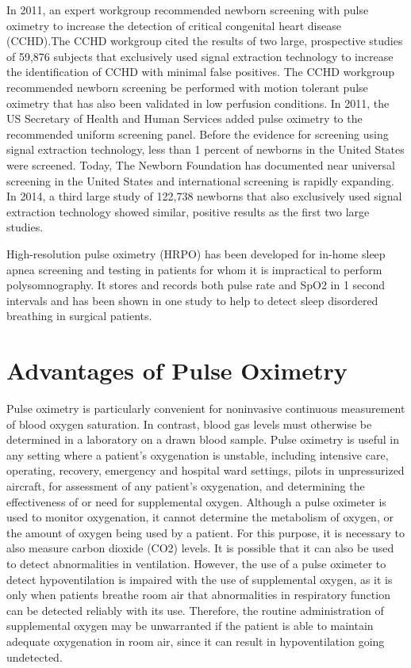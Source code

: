 \documentclass[12pt]{article}
\begin{document}
In 2011, an expert workgroup recommended newborn screening with pulse oximetry to increase the detection of critical congenital heart disease (CCHD).The CCHD workgroup cited the results of two large, prospective studies of 59,876 subjects that exclusively used signal extraction technology to increase the identification of CCHD with minimal false positives. The CCHD workgroup recommended newborn screening be performed with motion tolerant pulse oximetry that has also been validated in low perfusion conditions. In 2011, the US Secretary of Health and Human Services added pulse oximetry to the recommended uniform screening panel. Before the evidence for screening using signal extraction technology, less than 1 percent of newborns in the United States were screened. Today, The Newborn Foundation has documented near universal screening in the United States and international screening is rapidly expanding. In 2014, a third large study of 122,738 newborns that also exclusively used signal extraction technology showed similar, positive results as the first two large studies.

High-resolution pulse oximetry (HRPO) has been developed for in-home sleep apnea screening and testing in patients for whom it is impractical to perform polysomnography. It stores and records both pulse rate and SpO2 in 1 second intervals and has been shown in one study to help to detect sleep disordered breathing in surgical patients.


\section{Advantages of Pulse Oximetry}
Pulse oximetry is particularly convenient for noninvasive continuous measurement of blood oxygen saturation. In contrast, blood gas levels must otherwise be determined in a laboratory on a drawn blood sample. Pulse oximetry is useful in any setting where a patient's oxygenation is unstable, including intensive care, operating, recovery, emergency and hospital ward settings, pilots in unpressurized aircraft, for assessment of any patient's oxygenation, and determining the effectiveness of or need for supplemental oxygen. Although a pulse oximeter is used to monitor oxygenation, it cannot determine the metabolism of oxygen, or the amount of oxygen being used by a patient. For this purpose, it is necessary to also measure carbon dioxide (CO2) levels. It is possible that it can also be used to detect abnormalities in ventilation. However, the use of a pulse oximeter to detect hypoventilation is impaired with the use of supplemental oxygen, as it is only when patients breathe room air that abnormalities in respiratory function can be detected reliably with its use. Therefore, the routine administration of supplemental oxygen may be unwarranted if the patient is able to maintain adequate oxygenation in room air, since it can result in hypoventilation going undetected.
\end{document}
